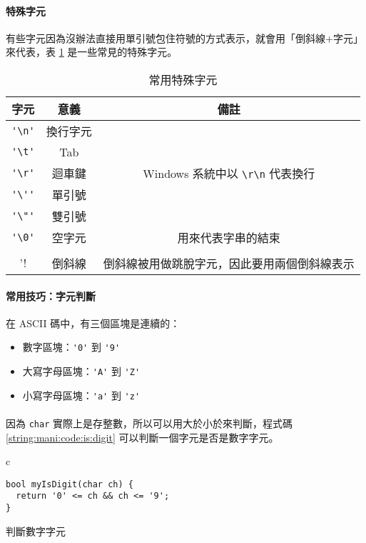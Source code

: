\documentclass[12pt,a4paper,oneside]{report}
\begin{document}
\begin{CJK}{UTF8}{bkai}
\paragraph{特殊字元}有些字元因為沒辦法直接用單引號包住符號的方式表示，就會用「倒斜線+字元」來代表，表 \ref{string:mani:table:char:special} 是一些常見的特殊字元。

\begin{table}[h!]
  \centering
  \begin{tabular}{|c|c|c|}
  \hline
  \textbf{字元} & \textbf{意義} & \textbf{備註}\\
  \hline\hline
  \lstinline!'\n'! & 換行字元 &\\
  \hline
  \lstinline!'\t'! & Tab &\\
  \hline
  \lstinline!'\r'! & 迴車鍵 & Windows 系統中以 \lstinline!\r\n! 代表換行\\
  \hline
  \lstinline!'\''! & 單引號 &\\
  \hline
  \lstinline!'\"'! & 雙引號 &\\
  \hline
  \lstinline!'\0'! & 空字元 & 用來代表字串的結束\\
  \hline
  \lstinline!'\\'! & 倒斜線 & 倒斜線被用做跳脫字元，因此要用兩個倒斜線表示\\
  \hline
  \end{tabular}
  \caption{常用特殊字元}
  \label{string:mani:table:char:special}
\end{table}

\paragraph{常用技巧：字元判斷}在 ASCII 碼中，有三個區塊是連續的：
\begin{itemize}
\item 數字區塊：\lstinline!'0'! 到 \lstinline!'9'!
\item 大寫字母區塊：\lstinline!'A'! 到 \lstinline!'Z'!
\item 小寫字母區塊：\lstinline!'a'! 到 \lstinline!'z'!
\end{itemize}

\paragraph{}因為 \lstinline!char! 實際上是存整數，所以可以用大於小於來判斷，程式碼 \ref{string:mani:code:is:digit} 可以判斷一個字元是否是數字字元。
\begin{code}[h!]
  \centering
  \begin{tabular}{c}
  \begin{lstlisting}
bool myIsDigit(char ch) {
  return '0' <= ch && ch <= '9';
}
  \end{lstlisting}
  \end{tabular}
  \caption{判斷數字字元}
  \label{string:mani:code:is:digit}
\end{code}


\end{CJK}
\end{document}
